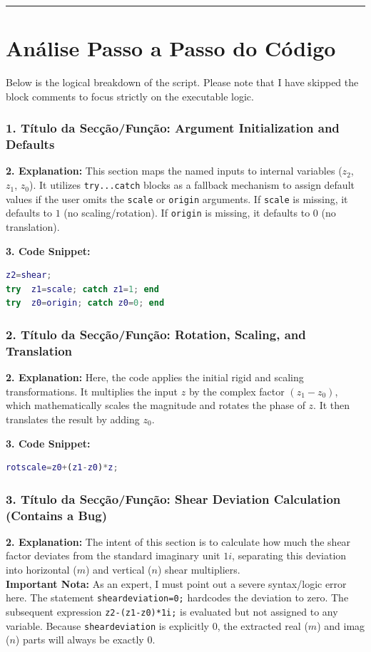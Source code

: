 \vspace{0.5cm}
\hrule
\vspace{0.5cm}

\section*{Análise Passo a Passo do Código}

Below is the logical breakdown of the script. Please note that I have skipped the block comments to focus strictly on the executable logic.

\subsubsection*{1. Título da Secção/Função: Argument Initialization and Defaults}
\textbf{2. Explanation:} This section maps the named inputs to internal variables ($z_2$, $z_1$, $z_0$). It utilizes \texttt{try...catch} blocks as a fallback mechanism to assign default values if the user omits the \texttt{scale} or \texttt{origin} arguments. If \texttt{scale} is missing, it defaults to $1$ (no scaling/rotation). If \texttt{origin} is missing, it defaults to $0$ (no translation).

\textbf{3. Code Snippet:}
\begin{lstlisting}[language=Matlab]
z2=shear;
try  z1=scale; catch z1=1; end
try  z0=origin; catch z0=0; end
\end{lstlisting}


\subsubsection*{2. Título da Secção/Função: Rotation, Scaling, and Translation}
\textbf{2. Explanation:} Here, the code applies the initial rigid and scaling transformations. It multiplies the input $z$ by the complex factor $(z_1 - z_0)$, which mathematically scales the magnitude and rotates the phase of $z$. It then translates the result by adding $z_0$.

\textbf{3. Code Snippet:}
\begin{lstlisting}[language=Matlab]
rotscale=z0+(z1-z0)*z;
\end{lstlisting}


\subsubsection*{3. Título da Secção/Função: Shear Deviation Calculation (Contains a Bug)}
\textbf{2. Explanation:} The intent of this section is to calculate how much the shear factor deviates from the standard imaginary unit $1i$, separating this deviation into horizontal ($m$) and vertical ($n$) shear multipliers. \\
\textbf{Important Nota:} As an expert, I must point out a severe syntax/logic error here. The statement \texttt{sheardeviation=0;} hardcodes the deviation to zero. The subsequent expression \texttt{z2-(z1-z0)*1i;} is evaluated but not assigned to any variable. Because \texttt{sheardeviation} is explicitly $0$, the extracted real ($m$) and imag ($n$) parts will always be exactly $0$.

